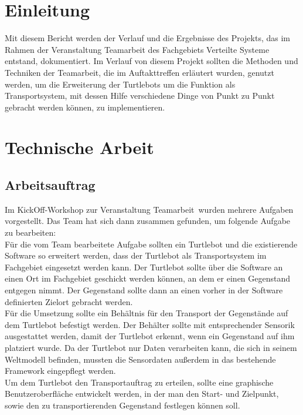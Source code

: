\documentclass[a4paper,12pt,headsepline]{scrartcl}
\begin{document}
	\tableofcontents
	\newpage
	
	\section{Einleitung}
Mit diesem Bericht werden der Verlauf und die Ergebnisse des Projekts, das im Rahmen der Veranstaltung Teamarbeit des Fachgebiets Verteilte Systeme entstand, dokumentiert. Im Verlauf von diesem Projekt sollten die Methoden und Techniken der Teamarbeit, die im Auftakttreffen erläutert wurden, genutzt werden, um die Erweiterung der Turtlebots um die Funktion als Transportsystem, mit dessen Hilfe verschiedene Dinge von Punkt zu Punkt gebracht werden können, zu implementieren.	
	\newpage
	\section{Technische Arbeit}
	
	\subsection{Arbeitsauftrag}
		Im KickOff-Workshop zur Veranstaltung \glqq Teamarbeit\grqq\ wurden mehrere Aufgaben vorgestellt. Das Team hat sich dann zusammen gefunden, um folgende Aufgabe zu bearbeiten: \\
		Für die vom Team bearbeitete Aufgabe sollten ein Turtlebot und die existierende Software so erweitert werden, dass der Turtlebot als Transportsystem im Fachgebiet eingesetzt werden kann. Der Turtlebot sollte über die Software an einen Ort im Fachgebiet geschickt werden können, an dem er einen Gegenstand entgegen nimmt. Der Gegenstand sollte dann an einen vorher in der Software definierten Zielort gebracht werden. \\
		Für die Umsetzung sollte ein Behältnis  für den Transport der Gegenstände auf dem Turtlebot befestigt werden. Der Behälter sollte mit entsprechender Sensorik ausgestattet werden, damit der Turtlebot erkennt, wenn ein Gegenstand auf ihm platziert wurde. Da der Turtlebot nur Daten verarbeiten kann, die sich in seinem Weltmodell befinden, mussten die Sensordaten außerdem in das bestehende Framework eingepflegt werden.\\
		Um dem Turtlebot den Transportauftrag zu erteilen, sollte eine graphische Benutzeroberfläche entwickelt werden, in der man den Start- und Zielpunkt, sowie den zu transportierenden Gegenstand festlegen können soll.  

		
	
\end{document}

